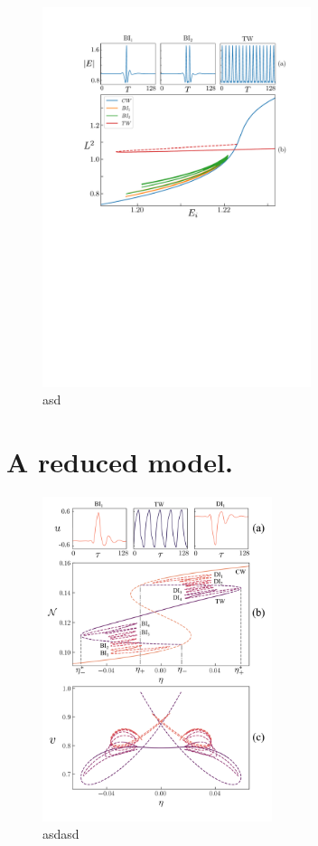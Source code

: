 \begin{figure}
    \centering
    \includegraphics[width=0.7\textwidth]{imagenes/lle/LLE_Isola.pdf}
    \caption{asd}
\end{figure}

\section{A reduced model.}

\begin{figure}
    \centering
    \caption{asdasd}
    \includegraphics[width=0.6\textwidth]{imagenes/lle/Fig3.png}
\end{figure}

